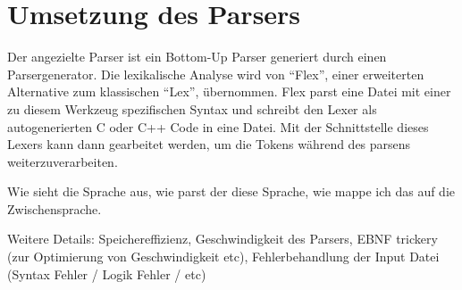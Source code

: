 \chapter{Umsetzung des Parsers}
\label{chap:building:parser}

Der angezielte Parser ist ein Bottom-Up Parser generiert durch einen Parsergenerator.
Die lexikalische Analyse wird von ``Flex'', einer erweiterten Alternative zum klassischen ``Lex'', übernommen.
Flex parst eine Datei mit einer zu diesem Werkzeug spezifischen Syntax und schreibt den Lexer als autogenerierten C oder C++ Code in eine Datei.
Mit der Schnittstelle dieses Lexers kann dann gearbeitet werden, um die Tokens während des parsens weiterzuverarbeiten.



Wie sieht die Sprache aus, wie parst der diese Sprache, wie mappe ich das auf die Zwischensprache.

Weitere Details: Speichereffizienz, Geschwindigkeit des Parsers, EBNF trickery (zur Optimierung von Geschwindigkeit etc), Fehlerbehandlung der Input Datei (Syntax Fehler / Logik Fehler / etc)
